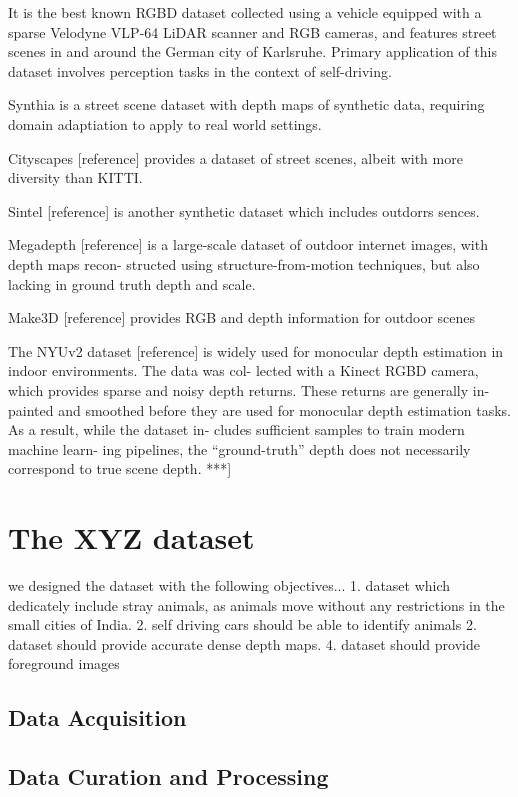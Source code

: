 \documentclass{article}
\begin{document}
It is the best known RGBD dataset collected using a vehicle equipped with a sparse Velodyne VLP-64 LiDAR scanner and RGB cameras, and features street scenes in and around the German city of Karlsruhe. Primary application of this dataset involves perception tasks in the context of self-driving.

Synthia is a street scene dataset with depth maps of synthetic data, requiring domain adaptiation to apply to real world settings. 

Cityscapes [reference] provides a dataset of street scenes, albeit with more diversity than KITTI.

Sintel [reference] is another synthetic dataset which includes outdorrs sences.

Megadepth [reference] is a large-scale dataset of outdoor internet images, with depth maps recon- structed using structure-from-motion techniques, but also lacking in ground truth depth and scale.

Make3D [reference] provides RGB and depth information for outdoor scenes

The NYUv2 dataset [reference] is widely used for monocular depth estimation in indoor environments. The data was col- lected with a Kinect RGBD camera, which provides sparse and noisy depth returns. These returns are generally in- painted and smoothed before they are used for monocular depth estimation tasks. As a result, while the dataset in- cludes sufficient samples to train modern machine learn- ing pipelines, the “ground-truth” depth does not necessarily correspond to true scene depth.
***]

\section{The XYZ dataset}
we designed the dataset with the following objectives...
1. dataset which dedicately include stray animals, as animals move without any restrictions in the small cities of India.
2. self driving cars should be able to identify animals
2. dataset should provide accurate dense depth maps.
4. dataset should provide foreground images

\subsection{Data Acquisition}
\subsection{Data Curation and Processing}
\end{document}
